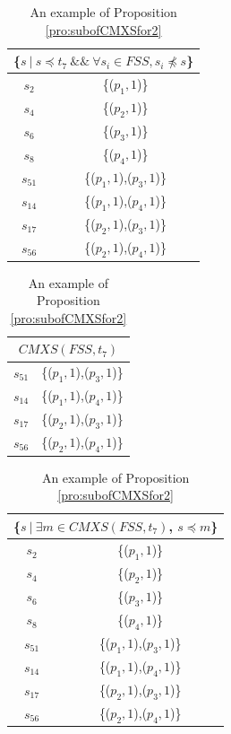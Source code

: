 
 \begin{table}[htbp]
  \centering
  \caption{An example of Proposition \ref{pro:subofCMXSfor2}}
  \label{examleOfCMXSPro2}
    \begin{tabular}{|c|c|} \hline
     \multicolumn{2}{|c|}{\{$s\ |\ s \preceq t_{7}\ \&\&\ \forall s_{i} \in FSS, s_{i} \npreceq s $\}} \\ \hline
   $s_{2}$ & \{($p_{1}, 1$)\} \\
   $s_{4}$ & \{($p_{2}, 1$)\} \\
   $s_{6}$ & \{($p_{3}, 1$)\} \\
   $s_{8}$ & \{($p_{4}, 1$)\} \\

   $s_{51}$ & \{($p_{1}, 1$),($p_{3}, 1$)\} \\
   $s_{14}$ & \{($p_{1}, 1$),($p_{4}, 1$)\} \\
   $s_{17}$ & \{($p_{2}, 1$),($p_{3}, 1$)\} \\
   $s_{56}$ & \{($p_{2}, 1$),($p_{4}, 1$)\} \\
    \hline
    \end{tabular}%
\quad
    \begin{tabular}{|c|c|} \hline
     \multicolumn{2}{|c|}{$CMXS(FSS, t_{7})$} \\ \hline
   $s_{51}$ & \{($p_{1}, 1$),($p_{3}, 1$)\} \\
   $s_{14}$ & \{($p_{1}, 1$),($p_{4}, 1$)\} \\
   $s_{17}$ & \{($p_{2}, 1$),($p_{3}, 1$)\} \\
   $s_{56}$ & \{($p_{2}, 1$),($p_{4}, 1$)\} \\
    \hline
    \end{tabular}%
\quad
    \begin{tabular}{|c|c|} \hline
   \multicolumn{2}{|c|}{\{$ s\ |\ \exists m \in CMXS(FSS, t_{7})$, $s \preceq m$\}}\\ \hline
   $s_{2}$ & \{($p_{1}, 1$)\} \\
   $s_{4}$ & \{($p_{2}, 1$)\} \\
   $s_{6}$ & \{($p_{3}, 1$)\} \\
   $s_{8}$ & \{($p_{4}, 1$)\} \\

   $s_{51}$ & \{($p_{1}, 1$),($p_{3}, 1$)\} \\
   $s_{14}$ & \{($p_{1}, 1$),($p_{4}, 1$)\} \\
   $s_{17}$ & \{($p_{2}, 1$),($p_{3}, 1$)\} \\
   $s_{56}$ & \{($p_{2}, 1$),($p_{4}, 1$)\} \\
   \hline
    \end{tabular}%
\end{table}


